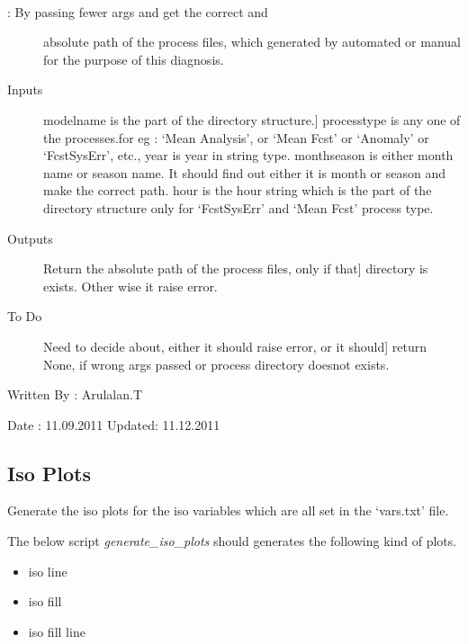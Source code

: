 \documentclass[letterpaper,10pt,english]{sphinxmanual}
\begin{document}

\begin{fulllineitems}
\label{diagnosis:generate_winds_plots.getProcessPath}~\begin{description}
\item[{{\hyperref[diagnosis:generate_winds_plots.getProcessPath]{}}: By passing fewer args and get the correct and}] \leavevmode
absolute path of the process files, which generated by automated or
manual for the purpose of this diagnosis.

\item[{Inputs}] \leavevmode{[}modelname is the part of the directory structure.{]}
processtype is any one of the processes.for eg : `Mean Analysis',
or `Mean Fcst' or `Anomaly' or `FcstSysErr', etc.,
year is year in string type.
monthseason is either month name or season name. It should find
out either it is month or season and make the correct path.
hour is the hour string which is the part of the directory
structure only for `FcstSysErr' and `Mean Fcst' process type.

\item[{Outputs}] \leavevmode{[}Return the absolute path of the process files, only if that{]}
directory is exists. Other wise it raise error.

\item[{To Do}] \leavevmode{[}Need to decide about, either it should raise error, or it should{]}
return None, if wrong args passed or process directory doesnot
exists.

\end{description}

Written By : Arulalan.T

Date : 11.09.2011
Updated: 11.12.2011

\end{fulllineitems}



\subsection{Iso Plots}
\label{diagnosis:iso-plots}
Generate the iso plots for the iso variables which are all set in the `vars.txt' file.

The below script \emph{generate\_iso\_plots} should generates the following kind of plots.
\begin{itemize}
\item {} 
iso line

\item {} 
iso fill

\item {} 
iso fill line

\end{itemize}
\end{document}
